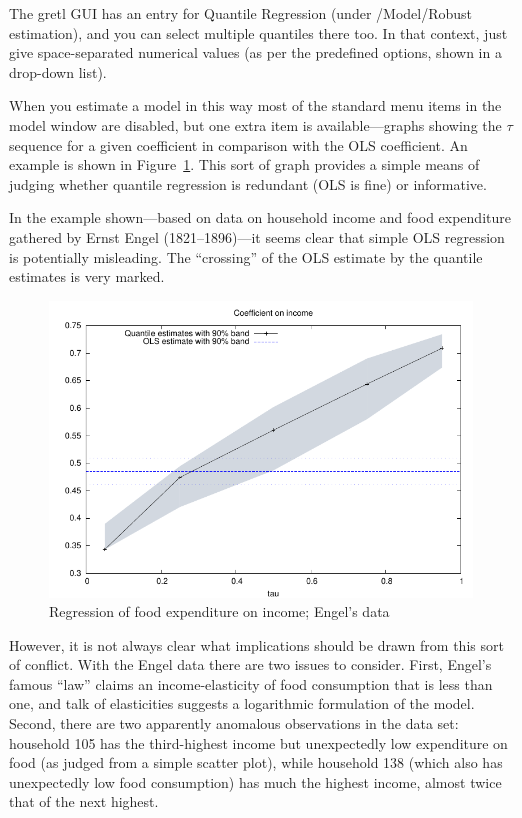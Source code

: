 The gretl GUI has an entry for Quantile Regression (under
\textsf{/Model/Robust estimation}), and you can select multiple
quantiles there too.  In that context, just give space-separated
numerical values (as per the predefined options, shown in a drop-down
list).  

When you estimate a model in this way most of the standard menu items
in the model window are disabled, but one extra item is
available---graphs showing the $\tau$ sequence for a given coefficient
in comparison with the OLS coefficient.  An example is shown in
Figure~\ref{fig:tau}.  This sort of graph provides a simple means of
judging whether quantile regression is redundant (OLS is fine) or
informative.

In the example shown---based on data on household income and food
expenditure gathered by Ernst Engel (1821--1896)---it seems clear
that simple OLS regression is potentially misleading.  The
``crossing'' of the OLS estimate by the quantile estimates is very
marked.  

\begin{figure}
  \centering
  \includegraphics{figures/tau-sequence}
  \caption{Regression of food expenditure on income; Engel's data}
  \label{fig:tau}
\end{figure}

However, it is not always clear what implications should be drawn from
this sort of conflict.  With the Engel data there are two issues to
consider.  First, Engel's famous ``law'' claims an income-elasticity
of food consumption that is less than one, and talk of elasticities
suggests a logarithmic formulation of the model.  Second, there are
two apparently anomalous observations in the data set: household 105
has the third-highest income but unexpectedly low expenditure on food
(as judged from a simple scatter plot), while household 138 (which
also has unexpectedly low food consumption) has much the highest
income, almost twice that of the next highest.

